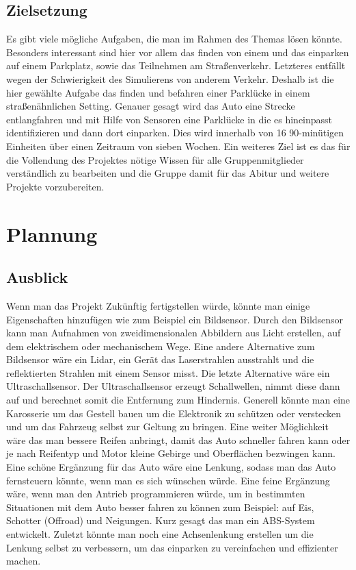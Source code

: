 \documentclass[notitlepage]{report}
\begin{document}
\section{Zielsetzung}
Es gibt viele m\"{o}gliche Aufgaben, die man im Rahmen des Themas l\"{o}sen k\"{o}nnte. Besonders interessant sind hier vor allem das finden von einem und das einparken auf einem Parkplatz, sowie das Teilnehmen am Stra{\ss}enverkehr. Letzteres entf\"{a}llt wegen der Schwierigkeit des Simulierens von anderem Verkehr. Deshalb ist die hier gew\"{a}hlte Aufgabe das finden und befahren einer Parkl\"{u}cke in einem stra{\ss}en\"{a}hnlichen Setting. Genauer gesagt wird das Auto eine Strecke entlangfahren und mit Hilfe von Sensoren eine Parkl\"{u}cke in die es hineinpasst identifizieren und dann dort einparken. Dies wird innerhalb von 16 90-min\"{u}tigen Einheiten \"{u}ber einen Zeitraum von sieben Wochen. Ein weiteres Ziel ist es das f\"{u}r die Vollendung des Projektes n\"{o}tige Wissen f\"{u}r alle Gruppenmitglieder verst\"{a}ndlich zu bearbeiten und die Gruppe damit f\"{u}r das Abitur und weitere Projekte vorzubereiten.

\chapter{Plannung}

\section{Ausblick}

Wenn man das Projekt Zukünftig fertigstellen würde, könnte man einige Eigenschaften hinzufügen wie zum Beispiel ein Bildsensor. Durch den Bildsensor kann man Aufnahmen von zweidimensionalen Abbildern aus Licht erstellen, auf dem elektrischem oder mechanischem Wege. Eine andere Alternative zum Bildsensor wäre ein Lidar, ein Gerät das Laserstrahlen ausstrahlt und die reflektierten Strahlen mit einem Sensor misst. Die letzte Alternative wäre ein Ultraschallsensor. Der Ultraschallsensor erzeugt Schallwellen, nimmt diese dann auf und berechnet somit die Entfernung zum Hindernis. Generell könnte man eine Karosserie um das Gestell bauen um die Elektronik zu schützen oder verstecken und um das Fahrzeug selbst zur Geltung zu bringen. Eine weiter Möglichkeit wäre das man bessere Reifen anbringt, damit das Auto schneller fahren kann oder je nach Reifentyp und Motor kleine Gebirge und Oberflächen bezwingen kann. Eine schöne Ergänzung für das Auto wäre eine Lenkung, sodass man das Auto fernsteuern könnte, wenn man es sich wünschen würde. Eine feine Ergänzung wäre, wenn man den Antrieb programmieren würde, um in bestimmten Situationen mit dem Auto besser fahren zu können zum Beispiel: auf Eis, Schotter (Offroad) und Neigungen. Kurz gesagt das man ein ABS-System entwickelt. Zuletzt könnte man noch eine Achsenlenkung erstellen um die Lenkung selbst zu verbessern, um das einparken zu vereinfachen und effizienter machen.
\end{document}
